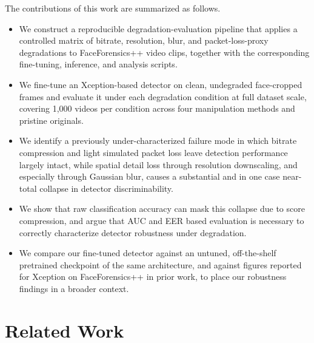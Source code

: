 \documentclass[conference]{IEEEtran}
\begin{document}
The contributions of this work are summarized as follows.
\begin{itemize}
\item We construct a reproducible degradation-evaluation pipeline that applies a controlled matrix of bitrate, resolution, blur, and packet-loss-proxy degradations to FaceForensics++ video clips, together with the corresponding fine-tuning, inference, and analysis scripts.
\item We fine-tune an Xception-based detector on clean, undegraded face-cropped frames and evaluate it under each degradation condition at full dataset scale, covering 1,000 videos per condition across four manipulation methods and pristine originals.
\item We identify a previously under-characterized failure mode in which bitrate compression and light simulated packet loss leave detection performance largely intact, while spatial detail loss through resolution downscaling, and especially through Gaussian blur, causes a substantial and in one case near-total collapse in detector discriminability.
\item We show that raw classification accuracy can mask this collapse due to score compression, and argue that AUC and EER based evaluation is necessary to correctly characterize detector robustness under degradation.
\item We compare our fine-tuned detector against an untuned, off-the-shelf pretrained checkpoint of the same architecture, and against figures reported for Xception on FaceForensics++ in prior work, to place our robustness findings in a broader context.
\end{itemize}

\section{Related Work}
\end{document}
